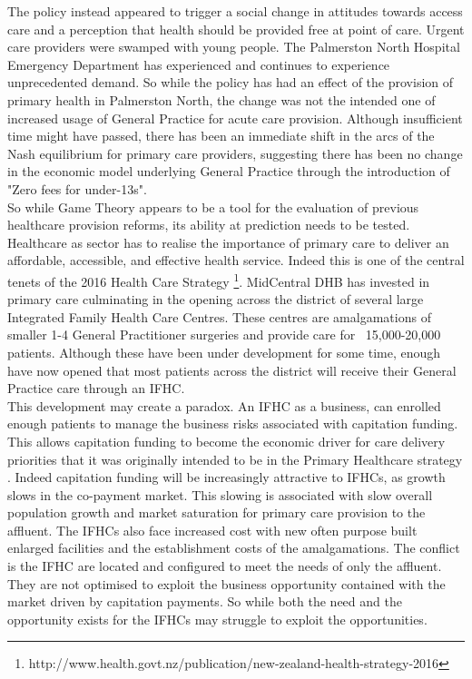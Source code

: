 \documentclass[11pt,a4paper]{article}
\begin{document}
The policy instead appeared to trigger a social change in attitudes towards access care and a perception that health should be provided free at point of care. Urgent care providers were swamped with young people. The Palmerston North Hospital Emergency Department has experienced and continues to experience unprecedented demand. So while the policy has had an effect of the provision of primary health in Palmerston North, the change was not the intended one of increased usage of General Practice for acute care provision. Although insufficient time might have passed, there has been an immediate shift in the arcs of the Nash equilibrium for primary care providers, suggesting there has been no change in the economic model underlying General Practice through the introduction of "Zero fees for under-13s".\\


So while Game Theory appears to be a tool for the evaluation of previous healthcare provision reforms, its ability at prediction needs to be tested. Healthcare as sector has to realise the importance of primary care to deliver an affordable, accessible, and effective health service. Indeed this is one of the central tenets of the 2016 Health Care Strategy \footnote{http://www.health.govt.nz/publication/new-zealand-health-strategy-2016}. MidCentral DHB has invested in primary care culminating in the opening across the district of several large Integrated Family Health Care Centres. These centres are amalgamations of smaller 1-4 General Practitioner surgeries and provide care for ~15,000-20,000 patients. Although these have been under development for some time, enough have now opened that most patients across the district will receive their General Practice care through an IFHC.\\


This development may create a paradox. An IFHC as a business, can enrolled enough patients to manage the business risks associated with capitation funding. This allows capitation funding to become the economic driver for care delivery priorities that it was originally intended to be in the Primary Healthcare strategy \citep{king2001primary}. Indeed capitation funding will be increasingly attractive to IFHCs, as growth slows in the co-payment market. This slowing is associated with slow overall population growth and market saturation for primary care provision to the affluent. The IFHCs also face increased cost with new often purpose built enlarged facilities and the establishment costs of the amalgamations. The conflict is the IFHC are located and configured to meet the needs of only the affluent. They are not optimised to exploit the business opportunity contained with the market driven by capitation payments. So while both the need and the opportunity exists for the IFHCs may struggle to exploit the opportunities.\\
\end{document}
